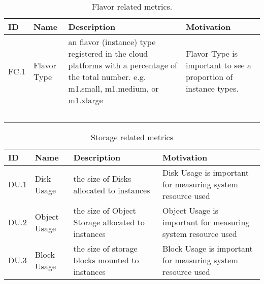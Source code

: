 \begin{table*}[P]
\caption{Flavor related metrics.}
\begin{scriptsize}
\label{T:metrics}
\bigskip
\begin{center}
\begin{tabular}{lp{}p{}p{}}
\hline
\rowcolor{blue!20} ID & Name & Description & Motivation \\
\hline 
FC.1 &
Flavor Type &
an flavor (instance) type registered in the cloud platforms with a
percentage of the total number. e.g. m1.small, m1.medium, or m1.xlarge & 
Flavor Type is important to see a proportion of instance types. \\
~\\
\hline
\end{tabular}
\end{center}
\end{scriptsize}
\end{table*}

\begin{table*}[P]
\caption{Storage related metrics}
\begin{scriptsize}
\label{T:metrics}
\bigskip
\begin{center}
\begin{tabular}{lp{}p{}p{}}
\hline
ID & Name & Description & Motivation \\
\hline  
DU.1 &
Disk Usage &
the size of Disks allocated to instances &
Disk Usage is important for measuring system resource used \\
\hline
DU.2 &
Object Usage &
the size of Object Storage allocated to instances &
Object Usage is important for measuring system resource used \\
\hline
DU.3 &
Block Usage &
the size of storage blocks mounted to instances &
Block Usage is important for measuring system resource used \\
\hline
\end{tabular}
\end{center}
\end{scriptsize}
\end{table*}

